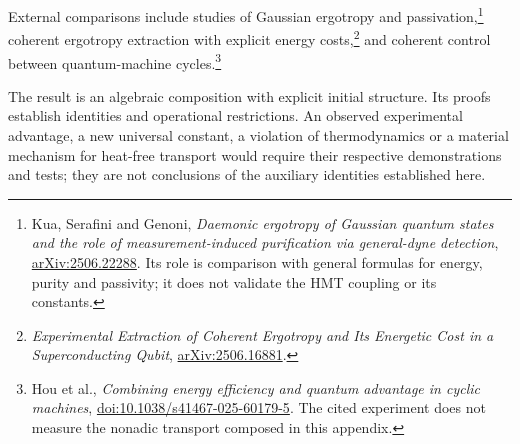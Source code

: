 External comparisons include studies of Gaussian ergotropy and
passivation,\footnote{Kua, Serafini and Genoni, \emph{Daemonic ergotropy
of Gaussian quantum states and the role of measurement-induced
purification via general-dyne detection},
\href{https://arxiv.org/abs/2506.22288}{arXiv:2506.22288}.
Its role is comparison with general formulas for energy, purity and
passivity; it does not validate the HMT coupling or its constants.}
coherent ergotropy extraction with explicit energy
costs,\footnote{\emph{Experimental Extraction of Coherent Ergotropy
and Its Energetic Cost in a Superconducting Qubit},
\href{https://arxiv.org/abs/2506.16881}{arXiv:2506.16881}.}
and coherent control between quantum-machine
cycles.\footnote{Hou et al., \emph{Combining energy efficiency and
quantum advantage in cyclic machines},
\href{https://doi.org/10.1038/s41467-025-60179-5}{doi:10.1038/s41467-025-60179-5}.
The cited experiment does not measure the nonadic transport composed
in this appendix.}

The result is an algebraic composition with explicit initial
structure. Its proofs establish identities and operational
restrictions. An observed experimental advantage, a new universal
constant, a violation of thermodynamics or a material mechanism for
heat-free transport would require their respective demonstrations
and tests; they are not conclusions of the auxiliary identities
established here.
